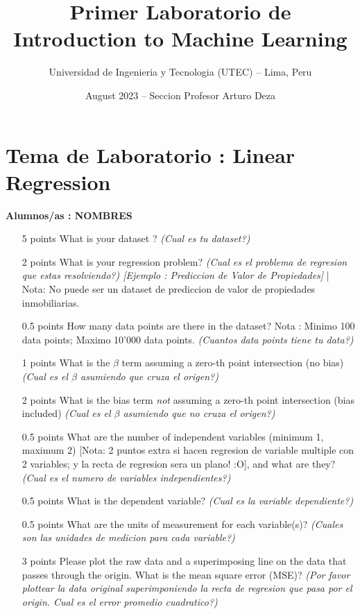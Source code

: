 \documentclass{article}
\title{Primer Laboratorio de Introduction to Machine Learning}
\author{Universidad de Ingenieria y Tecnologia (UTEC) -- Lima, Peru}
\date{August 2023 -- Seccion Profesor Arturo Deza}
\begin{document}
\maketitle
\small

\section*{Tema de Laboratorio : Linear Regression}

\textbf{Alumnos/as : NOMBRES}

\begin{enumerate}
\item [5 points] What is your dataset ? \textit{(Cual es tu dataset?)}
\item [2 points] What is your regression problem? \textit{(Cual es el problema de regresion que estas resolviendo?) [Ejemplo : Prediccion de Valor de Propiedades]} | Nota: No puede ser un dataset de prediccion de valor de propiedades inmobiliarias.
\item [0.5 points] How many data points are there in the dataset? Nota : Minimo 100 data points; Maximo 10'000 data points. \textit{(Cuantos data points tiene tu data?)}
\item [1 points] What is the $\beta$ term assuming a zero-th point intersection (no bias) \textit{(Cual es el $\beta$ asumiendo que cruza el origen?)}
\item [2 points] What is the bias term \textit{not} assuming a zero-th point intersection (bias included) \textit{(Cual es el $\beta$ asumiendo que no cruza el origen?)}
\item [0.5 points] What are the number of independent variables (minimum 1, maximum 2) [Nota: 2 puntos extra si hacen regresion de variable multiple con 2 variables; y la recta de regresion sera un plano! :O], and what are they? \textit{(Cual es el numero de variables independientes?)}
\item [0.5 points] What is the dependent variable? \textit{(Cual es la variable dependiente?)}
\item [0.5 points] What are the units of measurement for each variable(s)? \textit{(Cuales son las unidades de medicion para cada variable?)}
\item [3 points] Please plot the raw data and a superimposing line on the data that passes through the origin. What is the mean square error (MSE)? \textit{(Por favor plottear la data original superimponiendo la recta de regresion que pasa por el origin. Cual es el error promedio cuadratico?)}


\end{enumerate}
\end{document}
